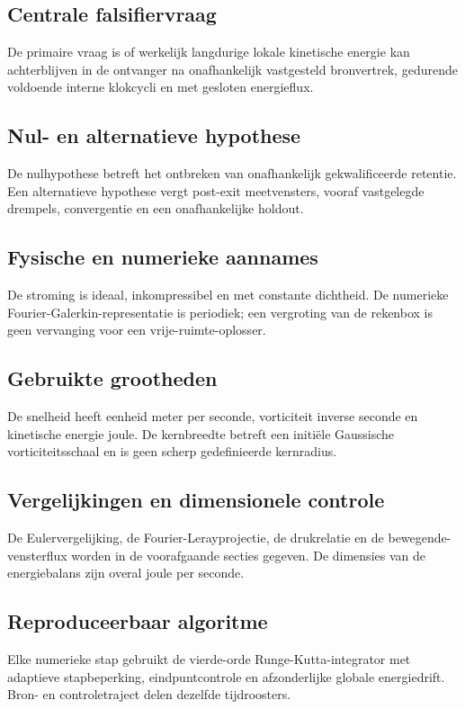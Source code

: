 \documentclass[10pt,a4paper]{article}
\begin{document}
\subsection{Centrale falsifiervraag}
De primaire vraag is of werkelijk langdurige lokale kinetische energie kan achterblijven in de ontvanger na onafhankelijk vastgesteld bronvertrek, gedurende voldoende interne klokcycli en met gesloten energieflux.
\subsection{Nul- en alternatieve hypothese}
De nulhypothese betreft het ontbreken van onafhankelijk gekwalificeerde retentie. Een alternatieve hypothese vergt post-exit meetvensters, vooraf vastgelegde drempels, convergentie en een onafhankelijke holdout.
\subsection{Fysische en numerieke aannames}
De stroming is ideaal, inkompressibel en met constante dichtheid. De numerieke Fourier-Galerkin-representatie is periodiek; een vergroting van de rekenbox is geen vervanging voor een vrije-ruimte-oplosser.
\subsection{Gebruikte grootheden}
De snelheid heeft eenheid meter per seconde, vorticiteit inverse seconde en kinetische energie joule. De kernbreedte betreft een initiële Gaussische vorticiteitsschaal en is geen scherp gedefinieerde kernradius.
\subsection{Vergelijkingen en dimensionele controle}
De Eulervergelijking, de Fourier-Lerayprojectie, de drukrelatie en de bewegende-vensterflux worden in de voorafgaande secties gegeven. De dimensies van de energiebalans zijn overal joule per seconde.
\subsection{Reproduceerbaar algoritme}
Elke numerieke stap gebruikt de vierde-orde Runge-Kutta-integrator met adaptieve stapbeperking, eindpuntcontrole en afzonderlijke globale energiedrift. Bron- en controletraject delen dezelfde tijdroosters.
\end{document}
